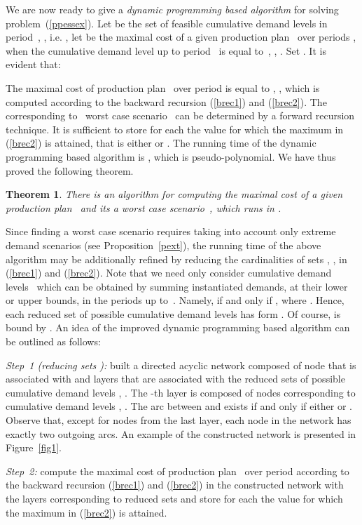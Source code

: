 \documentclass[11pt]{article}
\newtheorem{thm}{Theorem}
\begin{document}
We are now ready to give a \emph{dynamic programming based  algorithm} for solving 
problem~(\ref{ppessex}). Let   be the set of feasible 
cumulative demand levels in period~, , i.e.
,
let  be the maximal cost of a given production plan~
over periods , when the cumulative demand level up to period~ is
equal to~, , 
.
Set 
. It is evident that:

The maximal cost of production plan~ over period  is
equal to  , ,
which is computed according to the backward recursion (\ref{brec1}) and (\ref{brec2}).
The corresponding to~  worst case scenario~ can be determined
by a forward recursion technique. It is sufficient to store for 
each  the value for which 
the maximum in (\ref{brec2}) is attained, that is
either  or .
The running time of the dynamic programming based  algorithm is
, which is pseudo-polynomial.
We have  thus proved the following theorem.
\begin{thm}
There is an algorithm 
for computing the maximal cost of 
a given production plan~ and its a worst case scenario~,
which runs in .
\end{thm}
Since finding a worst case scenario
requires  taking into account only
extreme demand scenarios (see Proposition~\ref{pext}),
the running time of the above algorithm may be additionally refined
by reducing the cardinalities  
of sets  , ,
in (\ref{brec1}) and (\ref{brec2}).
Note that we need only consider 
cumulative demand levels~  which
can be obtained by summing  instantiated    demands, 
at  their lower or upper bounds, in the periods up to~.
Namely,  
if and only if  , where
.
Hence, each  reduced set
of possible  cumulative demand levels
 has form .
Of course,  is bound  by
 .
 An idea of  the improved
dynamic programming based  algorithm can be outlined as follows:

\noindent \emph{Step~1 (reducing sets ):} built
a directed acyclic network composed of node
that is  associated with   and 
 layers that are associated with 
the reduced sets 
of possible  cumulative demand levels
,
 .
The -th layer is composed of nodes
corresponding  to cumulative demand levels , 
.
The arc between  and  exists if and only if  either
  or
.
Observe that, 
except for nodes from the last
layer,
each node in the network has
exactly two outgoing arcs.
An example of the constructed network is presented in Figure~\ref{fig1}.

\noindent \emph{Step~2:} 
compute the maximal cost of production plan~ over period  according to the backward recursion (\ref{brec1}) and (\ref{brec2}) in the constructed
network with the layers corresponding to
reduced sets 
and store for each 
 the value  for which 
the maximum in (\ref{brec2}) is attained.
\end{document}
